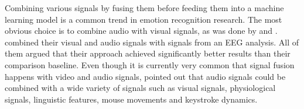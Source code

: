 \newline\newline
Combining various signals by fusing them before feeding them into a machine learning model is a common trend in emotion recognition research. The most obvious choice is to combine audio with visual signals, as was done by \citet{Yan:2016:MultiClueFusion} and \citet{Hossain:2019:AudioVisualER}. \citet{Xing:2019:EEGAudioVisual} combined their visual and audio signals with signals from an EEG analysis. All of them argued that their approach achieved significantly better results than their comparison baseline.\newline
Even though it is currently very common that signal fusion happens with video and audio signals, \citet{Akcay:2020:SpeechEmotionRecognition(SER)} pointed out that audio signals could be combined with a wide variety of signals such as visual signals, physiological signals, linguistic features, mouse movements and keystroke dynamics.



